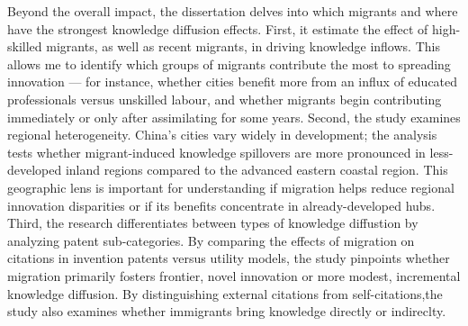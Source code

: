 \documentclass[12pt]{article}
\begin{document}
Beyond the overall impact, the dissertation delves into which migrants and where have the strongest knowledge diffusion effects. First, it estimate the effect of high-skilled migrants, as well as recent migrants, in driving knowledge inflows. This allows me to identify which groups of migrants contribute the most to spreading innovation --- for instance, whether cities benefit more from an influx of educated professionals versus unskilled labour, and whether migrants begin contributing immediately or only after assimilating for some years. Second, the study examines regional heterogeneity. China's cities vary widely in development; the analysis tests whether migrant-induced knowledge spillovers are more pronounced in less-developed inland regions compared to the advanced eastern coastal region. This geographic lens is important for understanding if migration helps reduce regional innovation disparities or if its benefits concentrate in already-developed hubs. Third, the research differentiates between types of knowledge diffustion by analyzing patent sub-categories. By comparing the effects of migration on citations in invention patents versus utility models, the study pinpoints whether migration primarily fosters frontier, novel innovation or more modest, incremental knowledge diffusion. By distinguishing external citations from self-citations,the study also examines whether immigrants bring knowledge directly or indireclty.
\end{document}
